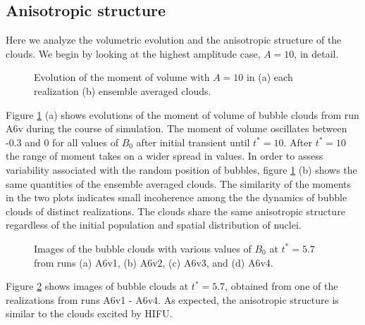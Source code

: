 \documentclass{jfm}
\begin{document}
\subsection{Anisotropic structure}
\label{subsec:anis}
Here we analyze the volumetric evolution and the anisotropic structure of the clouds.
We begin by looking at the highest amplitude case, $A=10$, in detail.

\begin{figure}
  \center
  \caption{Evolution of the moment of volume with $A=10$ in (a) each realization (b) ensemble averaged clouds.}
   \label{fig:xv_cent}
\end{figure}
Figure \ref{fig:xv_cent} (a) shows evolutions of the moment of volume of bubble clouds from run A6v during the course of simulation.
The moment of volume oscillates between -0.3 and 0 for all values of $B_0$ after initial transient until $t^*=10$. After $t^*=10$ the range of moment takes on a wider spread in values.
In order to assess variability associated with the random position of bubbles, figure \ref{fig:xv_cent} (b) shows the same quantities of the ensemble averaged clouds.
The similarity of the moments in the two plots indicates small incoherence among the the dynamics of bubble clouds of distinct realizations.
The clouds share the same anisotropic structure regardless of the initial population and spatial distribution of nuclei.

\begin{figure}
  \center
  \caption{Images of the bubble clouds with various values of $B_0$ at $t^*=5.7$ from runs (a) A6v1, (b) A6v2, (c) A6v3, and (d) A6v4.
   }
   \label{fig:snap_f300}
\end{figure}
Figure \ref{fig:snap_f300} shows images of bubble clouds at $t^*=5.7$, obtained from one of the realizations from runs A6v1 - A6v4.
As expected, the anisotropic structure is similar to the clouds excited by HIFU.
\end{document}
